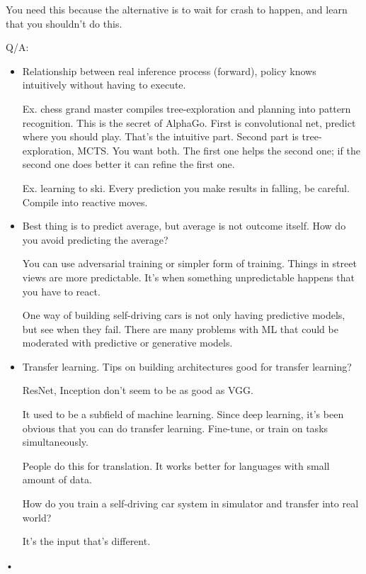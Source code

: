 You need this because the alternative is to wait for crash to happen, and learn that you shouldn't do this.


Q/A:
\begin{itemize}
\item
Relationship between real inference process (forward), policy knows intuitively without having to execute.

Ex. chess grand master compiles tree-exploration and planning into pattern recognition. This is the secret of AlphaGo. First is convolutional net, predict where you should play. That's the intuitive part. Second part is tree-exploration, MCTS. You want both. The first one helps the second one; if the second one does better it can refine the first one. 

Ex. learning to ski. Every prediction you make results in falling, be careful. Compile into reactive moves.

\item
Best thing is to predict average, but average is not outcome itself. 
How do you avoid predicting the average?

You can use adversarial training or simpler form of training. Things in street views are more predictable. It's when something unpredictable happens that you have to react. 

One way of building self-driving cars is not only having predictive models, but see when they fail. There are many problems with ML that could be moderated with predictive or generative models.
\item
Transfer learning. Tips on building architectures good for transfer learning?

ResNet, Inception don't seem to be as good as VGG.

It used to be a subfield of machine learning. Since deep learning, it's been obvious that you can do transfer learning. Fine-tune, or train on tasks simultaneously.

People do this for translation. It works better for languages with small amount of data.

How do you train a self-driving car system in simulator and transfer into real world?

It's the input that's different. 
\end{itemize}•
